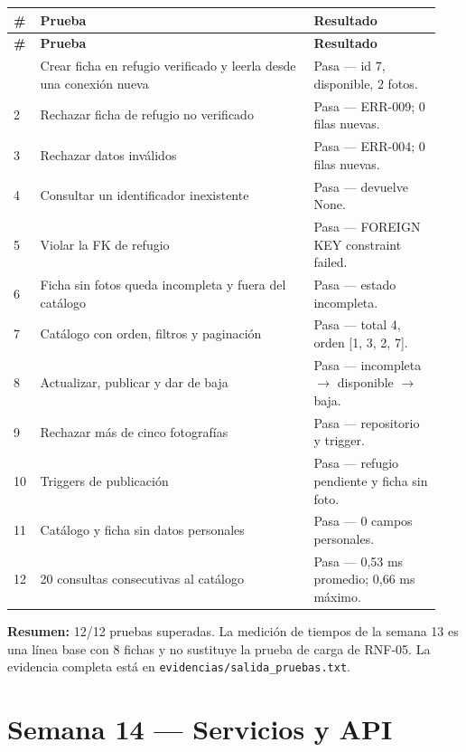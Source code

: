 \documentclass[11pt,a4paper]{article}
\newcommand{\code}[1]{\texttt{#1}}
\newcommand{\thead}[1]{\textbf{#1}}
\begin{document}
{\footnotesize
\begin{longtable}{@{}A{0.05\linewidth}L{0.60\linewidth}L{0.29\linewidth}@{}}
\toprule
\thead{\#} & \thead{Prueba} & \thead{Resultado} \\ \midrule \endfirsthead
\thead{\#} & \thead{Prueba} & \thead{Resultado} \\ \midrule \endhead
\bottomrule
{} & Crear ficha en refugio verificado y leerla desde una conexión nueva &
Pasa --- id 7, disponible, 2 fotos. \\
2 & Rechazar ficha de refugio no verificado &
Pasa --- ERR-009; 0 filas nuevas. \\
3 & Rechazar datos inválidos & Pasa --- ERR-004; 0 filas nuevas. \\
4 & Consultar un identificador inexistente & Pasa --- devuelve None. \\
5 & Violar la FK de refugio &
Pasa --- FOREIGN KEY constraint failed. \\
6 & Ficha sin fotos queda incompleta y fuera del catálogo &
Pasa --- estado incompleta. \\
7 & Catálogo con orden, filtros y paginación &
Pasa --- total 4, orden [1, 3, 2, 7]. \\
8 & Actualizar, publicar y dar de baja &
Pasa --- incompleta $\rightarrow$ disponible $\rightarrow$ baja. \\
9 & Rechazar más de cinco fotografías &
Pasa --- repositorio y trigger. \\
10 & Triggers de publicación &
Pasa --- refugio pendiente y ficha sin foto. \\
11 & Catálogo y ficha sin datos personales & Pasa --- 0 campos personales. \\
12 & 20 consultas consecutivas al catálogo &
Pasa --- 0,53 ms promedio; 0,66 ms máximo. \\
\end{longtable}
}

\textbf{Resumen:} 12/12 pruebas superadas. La medición de tiempos de la semana
13 es una línea base con 8 fichas y no sustituye la prueba de carga de RNF-05.
La evidencia completa está en \code{evidencias/salida\_pruebas.txt}.

\clearpage

\section{Semana 14 --- Servicios y API}
\end{document}
